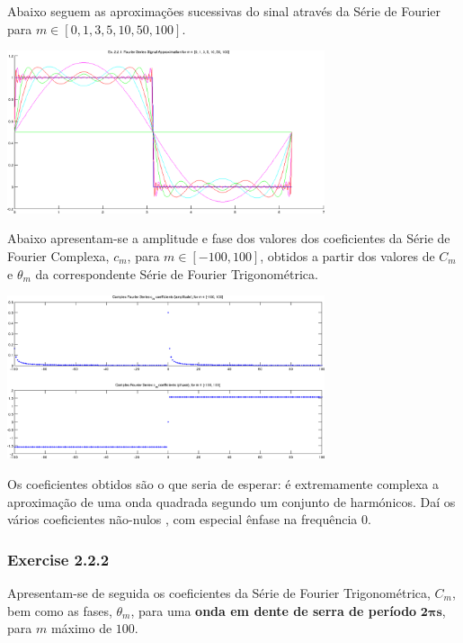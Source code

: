 \documentclass[a4paper]{article}
\begin{document}
\clearpage
\noindent Abaixo seguem as aproximações sucessivas do sinal através da Série de Fourier para $m \in [0, 1, 3, 5, 10, 50, 100]$.
\begin{center}
	\includegraphics[width=0.70\textwidth]{images/ex2_2_1_approx.png}
	\label{fig:ex2_2_1_approx}
\end{center}

\noindent Abaixo apresentam-se a amplitude e fase dos valores dos coeficientes da Série de Fourier Complexa, $c_m$, para $m \in [-100, 100]$, obtidos a partir dos valores de $C_m$ e $\theta_m$ da correspondente Série de Fourier Trigonométrica.
\begin{center}
	\includegraphics[width=0.70\textwidth]{images/ex2_2_1_complex_cm.png}
	\label{fig:ex2_2_1_complex_cm}
\end{center}

\noindent Os coeficientes obtidos são o que seria de esperar: é extremamente complexa a aproximação de uma onda quadrada segundo um conjunto de harmónicos. Daí os vários coeficientes não-nulos , com especial ênfase na frequência 0.

\clearpage
\subsubsection{Exercise 2.2.2}
\noindent Apresentam-se de seguida os coeficientes da Série de Fourier Trigonométrica, $C_m$, bem como as fases, $\theta_m$, para uma \textbf{onda em dente de serra de período} $\mathbf{2 \pi s}$, para $m$ máximo de $100$.
\end{document}
